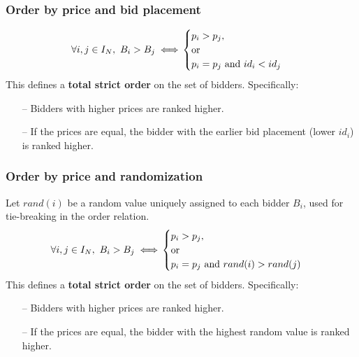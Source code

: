 \subsubsection{Order by price and bid placement}
\begin{equation*}
\forall i, j \in I_N, \ B_i > B_j \iff \\
\begin{cases} 
p_i > p_j,\\ 
\text{or} \\
p_i = p_j \text{ and } id_i < id_j
\end{cases}
\end{equation*}
This defines a \textbf{total strict order} on the set of bidders. Specifically:
\begin{itemize}
    \setlength\itemsep{0em}
    \item[--] Bidders with higher prices are ranked higher.
    \item[--] If the prices are equal, the bidder with the earlier bid placement (lower $id_i$) is ranked higher.
\end{itemize}

\subsubsection{Order by price and randomization}
Let $rand(i)$ be a random value uniquely assigned to each bidder $B_i$, used for tie-breaking in the order relation.   
\begin{equation*}
    \forall i, j \in I_N, \ B_i > B_j \iff \\
    \begin{cases} 
        p_i > p_j,\\ 
        \text{or} \\
        p_i = p_j \text{ and } rand(i) > rand(j)
    \end{cases}
\end{equation*}
This defines a \textbf{total strict order} on the set of bidders. Specifically:
\begin{itemize}
    \setlength\itemsep{0em}
    \item[--] Bidders with higher prices are ranked higher.
    \item[--] If the prices are equal, the bidder with the highest random value is ranked higher.
\end{itemize}
